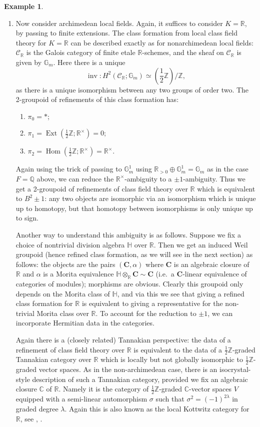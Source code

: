 \documentclass[12pt]{article}
\theoremstyle{definition}
\newtheorem{example}[theorem]{Example}
\newcommand{\on}{\operatorname}
\newcommand{\mc}{\mathcal}
\newcommand{\mbb}{\mathbb}
\begin{document}
\begin{example}
\begin{enumerate}
\item Now consider archimedean local fields.  Again, it suffices to consider $K=\mbb{R}$, by passing to finite extensions.  The class formation from local class field theory for $K=\mbb{R}$ can be described exactly as for nonarchimedean local fields: $\mc{C}_\mbb{R}$ is the Galois category of finite etale $\mbb{R}$-schemes, and the sheaf on $\mc{C}_\mbb{R}$ is given by $\mbb{G}_m$.  Here there is a unique
$$\on{inv}: H^2(\mc{C}_\mbb{R};\mbb{G}_m)\simeq \left(\frac{1}{2}\mbb{Z}\right)/\mbb{Z},$$
as there is a unique isomorphism between any two groups of order two.  The 2-groupoid of refinements of this class formation has:
\begin{enumerate}
\item $\pi_0=\ast$;
\item $\pi_1=\on{Ext}(\frac{1}{2}\mbb{Z};\mbb{R}^\times)=0$;
\item $\pi_2=\on{Hom}(\frac{1}{2}\mbb{Z};\mbb{R}^\times)=\mbb{R}^\times$.
\end{enumerate}
Again using the trick of passing to $\mbb{G}_m^1$ using $\mbb{R}_{>0}\oplus \mbb{G}_m^1= \mbb{G}_m$ as in the case $F=\mbb{Q}$ above, we can reduce the $\mbb{R}^\times$-ambiguity to a $\pm 1$-ambiguity.  Thus we get a 2-groupoid of refinements of class field theory over $\mbb{R}$ which is equivalent to $B^2\pm 1$: any two objects are isomorphic via an isomorphism which is unique up to homotopy, but that homotopy between isomorphisms is only unique up to sign.

Another way to understand this ambiguity is as follows.  Suppose we fix a choice of nontrivial division algebra $\mbb{H}$ over $\mbb{R}$.  Then we get an induced Weil groupoid (hence refined class formation, as we will see in the next section) as follows: the objects are the pairs $(\mathbf{C},\alpha)$ where $\mathbf{C}$ is an algebraic closure of $\mbb{R}$ and $\alpha$ is a Morita equivalence $\mbb{H}\otimes_{\mbb{R}}\mathbf{C}\sim \mathbf{C}$ (i.e.\ a $\mathbf{C}$-linear equivalence of categories of modules); morphisms are obvious.  Clearly this groupoid only depends on the Morita class of $\mathbb{H}$, and via this we see that giving a refined class formation for $\mbb{R}$ is equivalent to giving a representative for the non-trivial Morita class over $\mbb{R}$.  To account for the reduction to $\pm 1$, we can incorporate Hermitian data in the categories.

Again there is a (closely related) Tannakian perspective: the data of a refinement of class field theory over $\mbb{R}$ is equivalent to the data of a $\frac{1}{2}\mbb{Z}$-graded Tannakian category over $\mbb{R}$ which is locally but not globally isomorphic to $\frac{1}{2}\mbb{Z}$-graded vector spaces.  As in the non-archimedean case, there is an isocrystal-style description of such a Tannakian category, provided we fix an algebraic closure $\mbb{C}$ of $\mbb{R}$.  Namely it is the category of $\frac{1}{2}\mbb{Z}$-graded $\mbb{C}$-vector spaces $V$ equipped with a semi-linear automorphism $\sigma$ such that $\sigma^2 = (-1)^{2\lambda}$ in graded degree $\lambda$.  Again this is also known as the local Kottwitz category for $\mbb{R}$, see \cite{kottwitz}, \cite{iakovenko}.


\end{enumerate}
\end{example}
\end{document}
